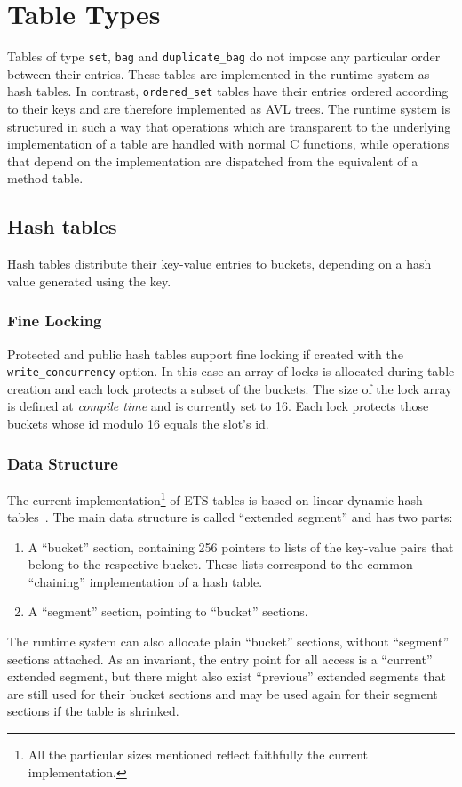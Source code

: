 \documentclass[aps,pre,preprint,nofootinbib]{revtex4}
\begin{document}
\section{Table Types} \label{sec:table_types}

Tables of type \verb|set|, \verb|bag| and \verb|duplicate_bag| do not impose any particular order between their entries.
These tables are implemented in the runtime system as hash tables.
In contrast, \verb|ordered_set| tables have their entries ordered according to their keys and are therefore implemented as AVL trees.
The runtime system is structured in such a way that operations which are transparent to the underlying implementation of a table are handled with normal C functions, while operations that depend on the implementation are dispatched from the equivalent of a method table.

\subsection{Hash tables}

Hash tables distribute their key-value entries to buckets, depending on a hash value generated using the key.

\subsubsection{Fine Locking}

Protected and public hash tables support fine locking if created with the \verb|write_concurrency| option.
In this case an array of locks is allocated during table creation and each lock protects a subset of the buckets.
The size of the lock array is defined at \emph{compile time} and is currently set to 16.
Each lock protects those buckets whose id modulo 16 equals the slot's id.

\subsubsection{Data Structure}

The current implementation\footnote{All the particular sizes mentioned reflect faithfully the current implementation.} of ETS tables is based on linear dynamic hash tables~\cite{Larson}.
The main data structure is called ``extended segment'' and has two parts:
\begin{enumerate}
  \item A ``bucket'' section, containing 256 pointers to lists of the key-value pairs that belong to the respective bucket.
    These lists correspond to the common ``chaining'' implementation of a hash table.
  \item A ``segment'' section, pointing to ``bucket'' sections.
\end{enumerate}
The runtime system can also allocate plain ``bucket'' sections, without ``segment'' sections attached.
As an invariant, the entry point for all access is a ``current'' extended segment, but there might also exist ``previous'' extended segments that are still used for their bucket sections and may be used again for their segment sections if the table is shrinked.
\end{document}
